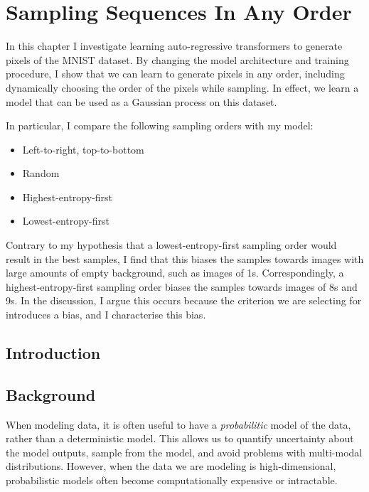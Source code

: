 \chapter{Sampling Sequences In Any Order}
\label{C:a-o-sampling}

In this chapter I investigate learning auto-regressive transformers to generate pixels of the MNIST dataset. By changing the model architecture and training procedure, I show that we can learn to generate pixels in any order, including dynamically choosing the order of the pixels while sampling. In effect, we learn a model that can be used as a Gaussian process on this dataset.

In particular, I compare the following sampling orders with my model:
\begin{itemize}
    \item Left-to-right, top-to-bottom
    \item Random
    \item Highest-entropy-first
    \item Lowest-entropy-first
\end{itemize}

Contrary to my hypothesis that a lowest-entropy-first sampling order would result in the best samples, I find that this biases the samples towards images with large amounts of empty background, such as images of 1s. Correspondingly, a highest-entropy-first sampling order biases the samples towards images of 8s and 9s. In the discussion, I argue this occurs because the criterion we are selecting for introduces a bias, and I characterise this bias.

\section{Introduction}


\section{Background}

When modeling data, it is often useful to have a \textit{probabilitic} model of the data, rather than a deterministic model. This allows us to quantify uncertainty about the model outputs, sample from the model, and avoid problems with multi-modal distributions. However, when the data we are modeling is high-dimensional, probabilistic models often become computationally expensive or intractable.

